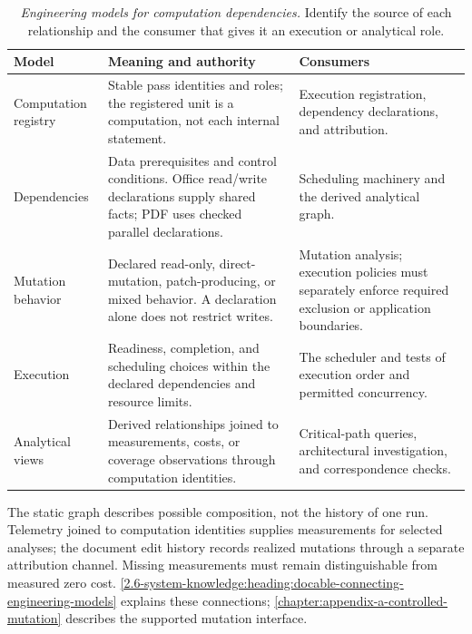 {\footnotesize
\begin{longtable}{@{}p{.20\linewidth}p{.36\linewidth}p{.36\linewidth}@{}}
\caption[Engineering models for computation dependencies]{\emph{Engineering models for computation dependencies.} Identify the source of each relationship and the consumer that gives it an execution or analytical role.}\label{handbook-computation-models}\\
\toprule
\textbf{Model} & \textbf{Meaning and authority} & \textbf{Consumers} \\
\midrule\endhead
Computation registry & Stable pass identities and roles; the registered unit is a computation, not each internal statement. & Execution registration, dependency declarations, and attribution. \\
Dependencies & Data prerequisites and control conditions. Office read/write declarations supply shared facts; PDF uses checked parallel declarations. & Scheduling machinery and the derived analytical graph. \\
Mutation behavior & Declared read-only, direct-mutation, patch-producing, or mixed behavior. A declaration alone does not restrict writes. & Mutation analysis; execution policies must separately enforce required exclusion or application boundaries. \\
Execution & Readiness, completion, and scheduling choices within the declared dependencies and resource limits. & The scheduler and tests of execution order and permitted concurrency. \\
Analytical views & Derived relationships joined to measurements, costs, or coverage observations through computation identities. & Critical-path queries, architectural investigation, and correspondence checks. \\
\bottomrule
\end{longtable}
}

The static graph describes possible composition, not the history of one run. Telemetry joined to computation identities supplies measurements for selected analyses; the document edit history records realized mutations through a separate attribution channel. Missing measurements must remain distinguishable from measured zero cost. \autoref{2.6-system-knowledge:heading:docable-connecting-engineering-models} explains these connections; \autoref{chapter:appendix-a-controlled-mutation} describes the supported mutation interface.

